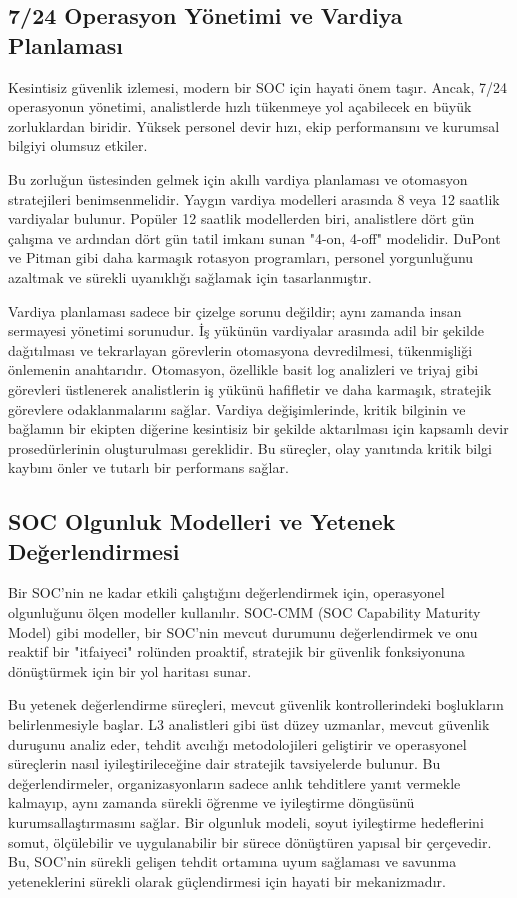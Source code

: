 \subsection{7/24 Operasyon Yönetimi ve Vardiya Planlaması}

Kesintisiz güvenlik izlemesi, modern bir SOC için hayati önem taşır. Ancak, 7/24 operasyonun yönetimi, analistlerde hızlı tükenmeye yol açabilecek en büyük zorluklardan biridir. Yüksek personel devir hızı, ekip performansını ve kurumsal bilgiyi olumsuz etkiler.

Bu zorluğun üstesinden gelmek için akıllı vardiya planlaması ve otomasyon stratejileri benimsenmelidir. Yaygın vardiya modelleri arasında 8 veya 12 saatlik vardiyalar bulunur. Popüler 12 saatlik modellerden biri, analistlere dört gün çalışma ve ardından dört gün tatil imkanı sunan "4-on, 4-off" modelidir. DuPont ve Pitman gibi daha karmaşık rotasyon programları, personel yorgunluğunu azaltmak ve sürekli uyanıklığı sağlamak için tasarlanmıştır.

Vardiya planlaması sadece bir çizelge sorunu değildir; aynı zamanda insan sermayesi yönetimi sorunudur. İş yükünün vardiyalar arasında adil bir şekilde dağıtılması ve tekrarlayan görevlerin otomasyona devredilmesi, tükenmişliği önlemenin anahtarıdır. Otomasyon, özellikle basit log analizleri ve triyaj gibi görevleri üstlenerek analistlerin iş yükünü hafifletir ve daha karmaşık, stratejik görevlere odaklanmalarını sağlar. Vardiya değişimlerinde, kritik bilginin ve bağlamın bir ekipten diğerine kesintisiz bir şekilde aktarılması için kapsamlı devir prosedürlerinin oluşturulması gereklidir. Bu süreçler, olay yanıtında kritik bilgi kaybını önler ve tutarlı bir performans sağlar.

\subsection{SOC Olgunluk Modelleri ve Yetenek Değerlendirmesi}

Bir SOC'nin ne kadar etkili çalıştığını değerlendirmek için, operasyonel olgunluğunu ölçen modeller kullanılır. SOC-CMM (SOC Capability Maturity Model) gibi modeller, bir SOC'nin mevcut durumunu değerlendirmek ve onu reaktif bir "itfaiyeci" rolünden proaktif, stratejik bir güvenlik fonksiyonuna dönüştürmek için bir yol haritası sunar.

Bu yetenek değerlendirme süreçleri, mevcut güvenlik kontrollerindeki boşlukların belirlenmesiyle başlar. L3 analistleri gibi üst düzey uzmanlar, mevcut güvenlik duruşunu analiz eder, tehdit avcılığı metodolojileri geliştirir ve operasyonel süreçlerin nasıl iyileştirileceğine dair stratejik tavsiyelerde bulunur. Bu değerlendirmeler, organizasyonların sadece anlık tehditlere yanıt vermekle kalmayıp, aynı zamanda sürekli öğrenme ve iyileştirme döngüsünü kurumsallaştırmasını sağlar. Bir olgunluk modeli, soyut iyileştirme hedeflerini somut, ölçülebilir ve uygulanabilir bir sürece dönüştüren yapısal bir çerçevedir. Bu, SOC'nin sürekli gelişen tehdit ortamına uyum sağlaması ve savunma yeteneklerini sürekli olarak güçlendirmesi için hayati bir mekanizmadır.

